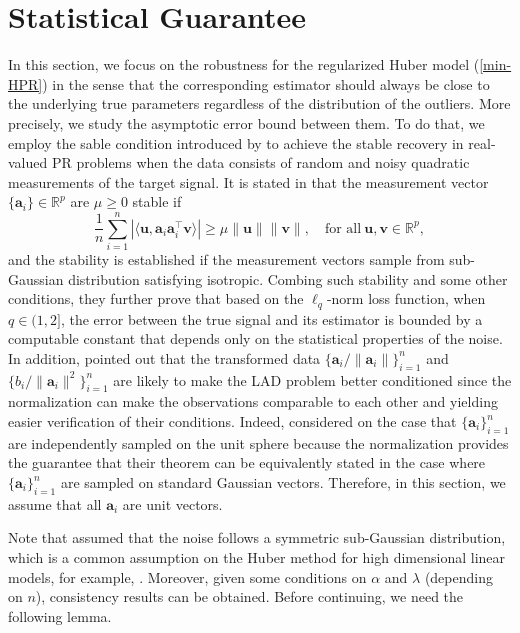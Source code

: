 \documentclass{article}
\numberwithin{equation}{section}
\begin{document}
\section{Statistical Guarantee}\label{Statistical}
In this section, we focus on the robustness for the regularized Huber model (\ref{min-HPR}) in the sense that the corresponding estimator should always be close to the underlying true parameters regardless of the distribution of the outliers. More precisely, we study the asymptotic error bound between them. To do that, we employ the sable condition introduced by \cite{eldar2014phase}  to achieve the stable recovery in real-valued PR problems when the data consists of random and noisy quadratic measurements of the target signal. It is stated in \cite{eldar2014phase} that  the measurement vector $\{\mathbf{a}_i\}\in\mathbb{R}^p$ are $\mu\geq0$ stable if 
		\begin{equation}\label{cond-ai-c1c2}
		\frac{1}{n}\sum_{i=1}^n|\langle \mathbf{u},\mathbf{a}_i\mathbf{a}_i^\top \mathbf{v}\rangle |\geq \mu\|\mathbf{u}\|\|\mathbf{v}\|, \quad \text{for all} ~\mathbf{u}, \mathbf{v}\in\mathbb{R}^p,
	\end{equation}
and the stability is established if the measurement vectors sample from sub-Gaussian distribution satisfying isotropic. Combing such stability and some other conditions, they further prove that based on the $\ell_q$-norm loss function, when $q\in(1,2]$, the error between the true signal and its estimator is bounded by a computable constant that depends only on the statistical properties of the noise. In addition, \cite{duchi2019solving} pointed out that the transformed data $\{\mathbf{a}_i/\|\mathbf{a}_i\|\}_{i=1}^n$ and $\{b_i/\|\mathbf{a}_i\|^2\}_{i=1}^n$ are likely to make the LAD problem better conditioned since the normalization can make the observations comparable to each other and yielding easier verification of their conditions. Indeed, \cite{candes2013phaselift} considered on the case that $\{\mathbf{a}_i\}_{i=1}^n$ are independently  sampled on the unit sphere because the normalization  provides the guarantee that their theorem can be equivalently stated in the case where $\{\mathbf{a}_i\}_{i=1}^n$ are
sampled on standard Gaussian vectors. Therefore, in this section, we assume that all $\mathbf{a}_i$ are unit vectors.


Note that \cite{eldar2014phase} assumed that the noise follows a symmetric sub-Gaussian distribution, which is a common assumption on the Huber method for high dimensional linear models, for example, \cite{fan2017estimation,lei2018asymptotics}. Moreover, given some conditions on $\alpha$ and $\lambda$ (depending on $n$), consistency results can be obtained.
Before continuing, we need the following lemma.
\end{document}
